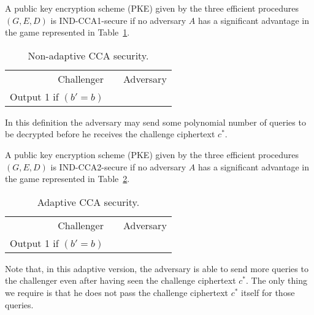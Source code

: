 \begin{definition}
A public key encryption scheme (PKE) given by the three efficient procedures $(G,E,D)$ is
IND-CCA1-secure if no adversary $A$ has a significant advantage in the game
represented in Table~\ref{tab:cca1}.
\begin{table}[ht]
\centering
\begin{tabular}{r c l}
Challenger & & Adversary \\
Output 1 if $(b'=b)$ & & \\
\end{tabular}
\caption{Non-adaptive CCA security.}\label{tab:cca1}
\end{table}

In this definition the adversary may send some polynomial number of queries
to be decrypted before he receives the challenge ciphertext $c^*$.
\end{definition}



\begin{definition}
A public key encryption scheme (PKE) given by the three efficient procedures $(G,E,D)$ is
IND-CCA2-secure if no adversary $A$ has a significant advantage in the game
represented in Table~\ref{tab:cca2}.
\begin{table}[t!]
\centering
\begin{tabular}{r c l}
Challenger & & Adversary \\
Output 1 if $(b'=b)$ & & \\
\end{tabular}
\caption{Adaptive CCA security.}\label{tab:cca2}
\end{table}

Note that, in this adaptive version, the adversary is able to send more queries to the
challenger even after having seen the challenge ciphertext $c^*$. The only thing we require
is that he does not pass the challenge ciphertext $c^*$ itself for those queries.
\end{definition}


